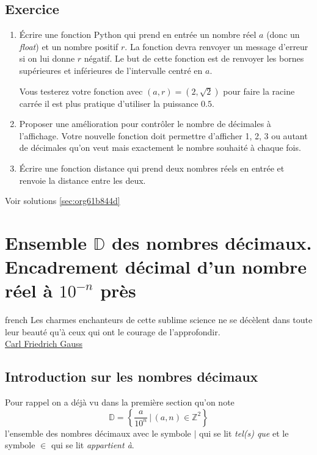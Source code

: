 \documentclass[a4paper, 11pt, twoside]{book}
\newcommand{\Z}{\mathbb{Z}}
\newcommand{\D}{\mathbb{D}}
\begin{document}
\section{Exercice}
\label{sec:org3d7fca9}
\begin{enumerate}
\item Écrire une fonction Python qui prend en entrée un nombre réel
\(a\) (donc un \emph{float}) et un nombre positif \(r\). La fonction
devra renvoyer un message d'erreur si on lui donne \(r\)
négatif. Le but de cette fonction est de renvoyer les bornes
supérieures et inférieures de l'intervalle centré en \(a\).

Vous testerez votre fonction avec \((a, r) = (2, \sqrt{2})\) pour
faire la racine carrée il est plus pratique d'utiliser la
puissance \(0.5\).
\item Proposer une amélioration pour contrôler le nombre de décimales
à l'affichage. Votre nouvelle fonction doit permettre
d'afficher 1, 2, 3 ou autant de décimales qu'on veut mais
exactement le nombre souhaité à chaque fois.
\item Écrire une fonction distance qui prend deux nombres réels en
entrée et renvoie la distance entre les deux.
\end{enumerate}


Voir solutions \ref{sec:org61b844d}
\stopcontents[level-2]

\chapter{Ensemble \(\D\) des nombres décimaux. Encadrement décimal d'un nombre réel à \(10^{-n}\) près}
\label{sec:orgc3941c4}
\startcontents[level-2]

\begin{foreigndisplayquote}{french}
Les charmes enchanteurs de cette sublime science ne se décèlent
dans toute leur beauté qu'à ceux qui ont le courage de
l'approfondir.\\

\href{https://fr.wikipedia.org/wiki/Carl\_Friedrich\_Gauss}{Carl Friedrich Gauss}
\end{foreigndisplayquote}

\section{Introduction sur les nombres décimaux}
\label{sec:org6c1732c}

Pour rappel on a déjà vu dans la première section qu'on note
\[\D = \left\{ \dfrac{a}{10^n}\,|\,(a, n)\in\Z^2\right\}\]
l'ensemble des nombres décimaux avec le symbole \(|\) qui se lit
\emph{tel(s) que} et le symbole \(\in\) qui se lit \emph{appartient à}.
\end{document}
